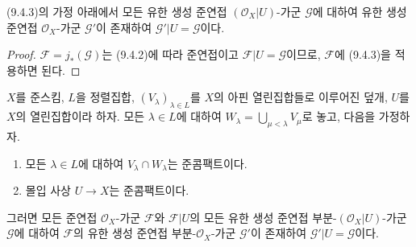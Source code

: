 \begin{corollary}[9.4.5]
\label{I.9.4.5-ko}
(9.4.3)의 가정 아래에서 모든 유한 생성 준연접
$(\mathscr{O}_X|U)$-가군 $\mathscr{G}$에 대하여 유한 생성 준연접
$\mathscr{O}_X$-가군 $\mathscr{G}'$이 존재하여
$\mathscr{G}'|U=\mathscr{G}$이다.
\end{corollary}

\begin{proof}
$\mathscr{F}=j_*(\mathscr{G})$는 (9.4.2)에 따라 준연접이고
$\mathscr{F}|U=\mathscr{G}$이므로, $\mathscr{F}$에 (9.4.3)을 적용하면
된다.
\end{proof}

\begin{lemma}[9.4.6]
\label{I.9.4.6-ko}
$X$를 준스킴, $L$을 정렬집합,
$(V_\lambda)_{\lambda\in L}$를 $X$의 아핀 열린집합들로 이루어진 덮개,
$U$를 $X$의 열린집합이라 하자. 모든 $\lambda\in L$에 대하여
$W_\lambda=\bigcup_{\mu<\lambda}V_\mu$로 놓고, 다음을 가정하자.
\begin{enumerate}
  \item[1\textsuperscript{o}] 모든 $\lambda\in L$에 대하여
    $V_\lambda\cap W_\lambda$는 준콤팩트이다.
  \item[2\textsuperscript{o}] 몰입 사상 $U\to X$는 준콤팩트이다.
\end{enumerate}
그러면 모든 준연접 $\mathscr{O}_X$-가군 $\mathscr{F}$와
$\mathscr{F}|U$의 모든 유한 생성 준연접
부분-$(\mathscr{O}_X|U)$-가군 $\mathscr{G}$에 대하여 $\mathscr{F}$의
유한 생성 준연접 부분-$\mathscr{O}_X$-가군 $\mathscr{G}'$이 존재하여
$\mathscr{G}'|U=\mathscr{G}$이다.
\end{lemma}

